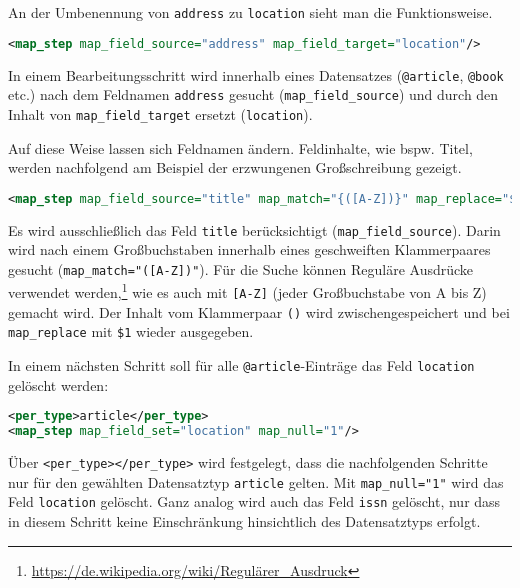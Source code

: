 \documentclass[ngerman]{dtk}
\begin{document}
An der Umbenennung von \texttt{address} zu \texttt{location} sieht man die Funktionsweise.
\begin{lstlisting}[style=nonumber,language=xml]
<map_step map_field_source="address" map_field_target="location"/>
\end{lstlisting}
In einem Bearbeitungsschritt wird innerhalb eines Datensatzes (\texttt{@article}, \texttt{@book} etc.) nach dem Feldnamen \texttt{address} gesucht (\texttt{map\_field\_source}) und durch den Inhalt
von \texttt{map\_field\_target} ersetzt (\texttt{location}).

Auf diese Weise lassen sich Feldnamen ändern. 
Feldinhalte, wie bspw. Titel, werden nachfolgend
am Beispiel der erzwungenen Großschreibung gezeigt.
\begin{lstlisting}[style=nonumber,language=xml]
<map_step map_field_source="title" map_match="{([A-Z])}" map_replace="$1"/>
\end{lstlisting}
Es wird ausschließlich das Feld \texttt{title} berücksichtigt (\texttt{map\_field\_source}).
Darin wird nach einem Großbuchstaben innerhalb eines geschweiften Klammerpaares gesucht 
(\texttt{map\_match="{([A-Z])}"}). Für die Suche können Reguläre Ausdrücke verwendet
 werden,\footnote{\url{https://de.wikipedia.org/wiki/Regulärer_Ausdruck}}
wie es auch mit \texttt{[A-Z]} (jeder Großbuchstabe von A bis Z) gemacht wird.
Der Inhalt vom Klammerpaar \texttt{()} wird zwischengespeichert und bei \texttt{map\_replace} mit 
\texttt{\$1} wieder ausgegeben.

In einem nächsten Schritt soll für alle \texttt{@article}-Einträge das Feld \texttt{location} gelöscht werden:
\begin{lstlisting}[style=nonumber,language=xml]
<per_type>article</per_type>
<map_step map_field_set="location" map_null="1"/>
\end{lstlisting}
Über \texttt{<per\_type>}\texttt{</per\_type>} wird festgelegt, 
dass die nachfolgenden Schritte nur für den gewählten 
Datensatztyp \texttt{article} gelten. 
Mit \texttt{map\_null="1"} wird das Feld \texttt{location} gelöscht.
Ganz analog wird auch das Feld \texttt{issn} gelöscht, nur dass in diesem Schritt
keine Einschränkung hinsichtlich des Datensatztyps erfolgt.
\end{document}

